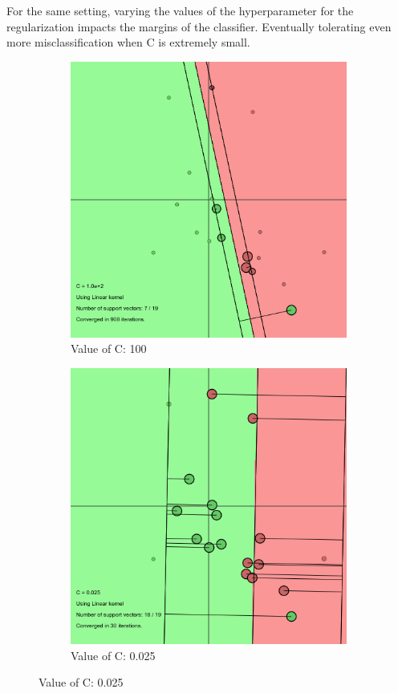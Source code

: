 \documentclass[11pt, a4paper]{article}
\begin{document}
For the same setting, varying the values of the hyperparameter for the
regularization impacts the margins of the classifier. Eventually
tolerating even more misclassification when C is extremely small.

\begin{figure}[H]
    \centering
    \begin{subfigure}{.5\textwidth}
      \centering
      \includegraphics[width=0.9\linewidth]{1-2-1-linear_c_max.png}
      \caption{Value of C: 100}
      \label{fig:lin3}
    \end{subfigure}%
    \begin{subfigure}{.5\textwidth}
      \centering
      \includegraphics[width=0.9\linewidth]{1-2-1-linear_c_min.png}
      \caption{Value of C: 0.025}
      \label{fig:lin4}
    \end{subfigure}
    \label{fig:bull}
\end{figure}
\end{document}
